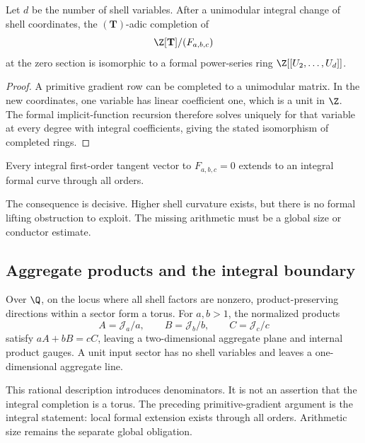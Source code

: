 \begin{theorem}
Let $d$ be the number of shell variables. After a unimodular integral change of shell coordinates, the $(\mathbf T)$-adic completion of
\[
 \Z[\mathbf T]/(F_{a,b,c})
\]
at the zero section is isomorphic to a formal power-series ring $\Z[[U_2,\ldots,U_d]]$.
\end{theorem}

\begin{proof}
A primitive gradient row can be completed to a unimodular matrix. In the new coordinates, one variable has linear coefficient one, which is a unit in $\Z$. The formal implicit-function recursion therefore solves uniquely for that variable at every degree with integral coefficients, giving the stated isomorphism of completed rings.
\end{proof}

\begin{corollary}
Every integral first-order tangent vector to $F_{a,b,c}=0$ extends to an integral formal curve through all orders.
\end{corollary}

The consequence is decisive. Higher shell curvature exists, but there is no formal lifting obstruction to exploit. The missing arithmetic must be a global size or conductor estimate.

\subsection{Aggregate products and the integral boundary}
Over $\Q$, on the locus where all shell factors are nonzero, product-preserving directions within a sector form a torus. For $a,b>1$, the normalized products
\[
 A=\mathscr J_a/a,\qquad B=\mathscr J_b/b,\qquad C=\mathscr J_c/c
\]
satisfy $aA+bB=cC$, leaving a two-dimensional aggregate plane and internal product gauges. A unit input sector has no shell variables and leaves a one-dimensional aggregate line.

This rational description introduces denominators. It is not an assertion that the integral completion is a torus. The preceding primitive-gradient argument is the integral statement: local formal extension exists through all orders. Arithmetic size remains the separate global obligation.
